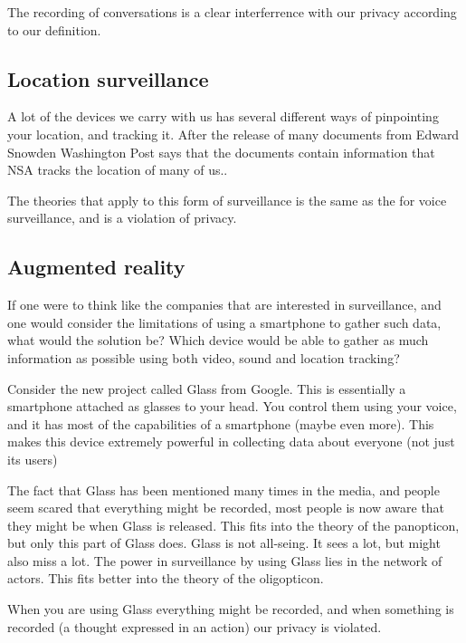The recording of conversations is a clear interferrence with our privacy according to our definition.

\subsection{Location surveillance}
A lot of the devices we carry with us has several different ways of pinpointing your location, and tracking it. After the release of many documents from Edward Snowden Washington Post says that the documents contain information that NSA tracks the location of many of us.\cite{website:nsa-track}.

The theories that apply to this form of surveillance is the same as the for voice surveillance, and is a violation of privacy.

\subsection{Augmented reality}
If one were to think like the companies that are interested in surveillance, and one would consider the limitations of using a smartphone to gather such data, what would the solution be? Which device would be able to gather as much information as possible using both video, sound and location tracking?

Consider the new project called Glass from Google. This is essentially a smartphone attached as glasses to your head. You control them using your voice, and it has most of the capabilities of a smartphone (maybe even more). This makes this device extremely powerful in collecting data about everyone (not just its users)\cite{website:google-glass}

The fact that Glass has been mentioned many times in the media, and people seem scared that everything might be recorded, most people is now aware that they might be when Glass is released. This fits into the theory of the panopticon, but only this part of Glass does. Glass is not all-seing. It sees a lot, but might also miss a lot. The power in surveillance by using Glass lies in the network of actors. This fits better into the theory of the oligopticon.\cite{website:glass-fears}

When you are using Glass everything might be recorded, and when something is recorded (a thought expressed in an action) our privacy is violated.
